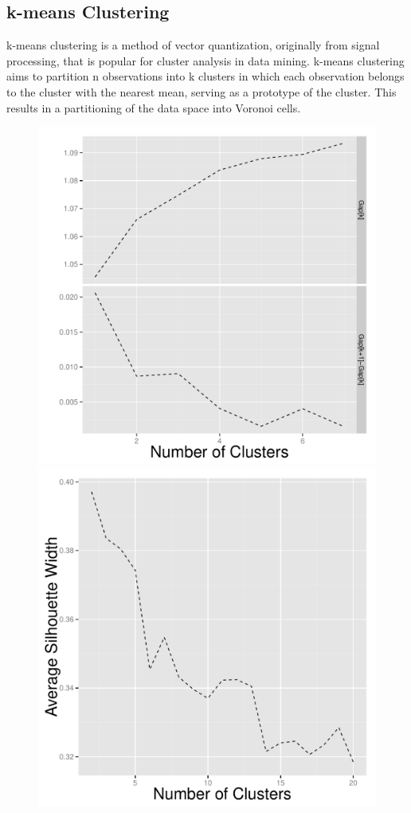 \subsection{k-means Clustering}

\qquad k-means clustering is a method of vector quantization, originally from
signal processing, that is popular for cluster analysis in data
mining. k-means clustering aims to partition n observations into k
clusters in which each observation belongs to the cluster with the
nearest mean, serving as a prototype of the cluster. This results in a
partitioning of the data space into Voronoi cells. \\

\begin{figure}
  \begin{minipage}[t]{0.33\textwidth}
    \includegraphics[width=\textwidth, height =0.8\textwidth]{fig/Gap_plot.pdf}
    \subcaption{}
  \end{minipage}
  \begin{minipage}[t]{0.33\textwidth}
    \includegraphics[width=\textwidth, height =0.8\textwidth]{fig/ave_sil.pdf}

\end{minipage}
\end{figure}
